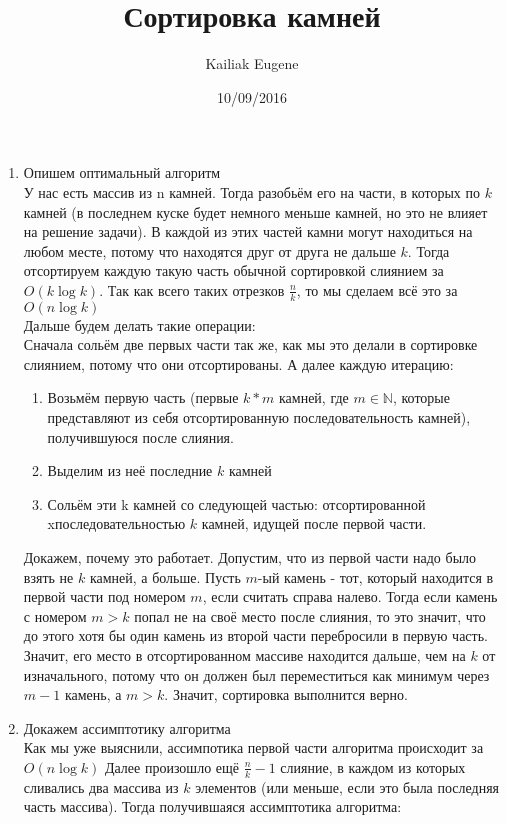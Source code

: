 \documentclass[12pt]{article}
\title{Сортировка камней}
\date{10/09/2016}
\author{Kailiak Eugene}
\begin{document}
\maketitle
\begin{enumerate} 
    \item Опишем оптимальный алгоритм \\
    У нас есть массив из n камней. Тогда разобьём его на части, в которых по $k$ камней (в последнем куске будет немного меньше камней, но это не влияет на решение задачи). В каждой из этих частей камни могут находиться на любом месте, потому что находятся друг от друга не дальше $k$. Тогда отсортируем каждую такую часть обычной сортировкой слиянием за $O(k \log{k})$. Так как всего таких отрезков $\frac{n}{k}$, то мы сделаем всё это за $O(n \log{k})$  \\
    Дальше будем делать такие операции: \\
    Сначала сольём две первых части так же, как мы это делали в сортировке слиянием, потому что они отсортированы. А далее каждую итерацию:
    \begin{enumerate}
    	\item Возьмём первую часть (первые $k*m$ камней, где $m \in \mathbb{N}$, которые представляют из себя отсортированную последовательность камней), получившуюся после слияния. 
    	\item Выделим из неё последние $k$ камней
    	\item Сольём эти k камней со следующей частью: отсортированной xпоследовательностью $k$ камней, идущей после первой части.
    \end{enumerate}
    Докажем, почему это работает. Допустим, что из первой части надо было взять не $k$ камней, а больше. Пусть $m$-ый камень - тот, который находится в первой части под номером $m$, если считать справа налево. Тогда если камень с номером $m>k$ попал не на своё место после слияния, то это значит, что до этого хотя бы один камень из второй части перебросили в первую часть. Значит, его место в отсортированном массиве находится дальше, чем на $k$ от изначального, потому что он должен был переместиться как минимум через $m-1$ камень, а $m>k$. Значит, сортировка выполнится верно. 
    \item Докажем ассимптотику алгоритма \\
    Как мы уже выяснили, ассимпотика первой части алгоритма происходит за $O(n\log{k})$ Далее произошло ещё $\frac{n}{k} - 1$ слияние, в каждом из которых сливались два массива из $k$ элементов (или меньше, если это была последняя часть массива). Тогда получившаяся ассимптотика алгоритма:

\end{enumerate}
\end{document}
